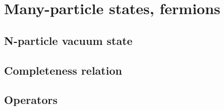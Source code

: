\section{Many-particle states, fermions}

\subsection{N-particle vacuum state}

\subsection{Completeness relation}

\subsection{Operators}